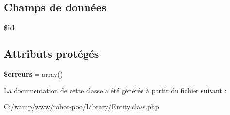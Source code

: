 \subsection*{Champs de données}
\begin{DoxyCompactItemize}
\item 
\hypertarget{class_library_1_1_entity_ae97941710d863131c700f069b109991e}{{\bfseries \$id}}\label{class_library_1_1_entity_ae97941710d863131c700f069b109991e}

\end{DoxyCompactItemize}
\subsection*{Attributs protégés}
\begin{DoxyCompactItemize}
\item 
\hypertarget{class_library_1_1_entity_a892055c814a82fc7c562b42a8b8faaf5}{{\bfseries \$erreurs} = array()}\label{class_library_1_1_entity_a892055c814a82fc7c562b42a8b8faaf5}

\end{DoxyCompactItemize}


La documentation de cette classe a été générée à partir du fichier suivant \+:\begin{DoxyCompactItemize}
\item 
C\+:/wamp/www/robot-\/poo/\+Library/Entity.\+class.\+php\end{DoxyCompactItemize}
